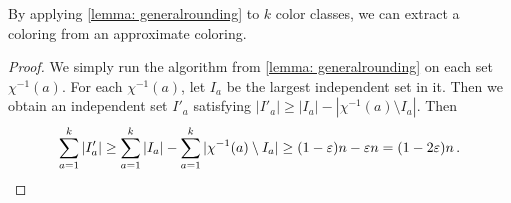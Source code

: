 By applying \cref{lemma: generalrounding} to $k$ color classes, we can extract a coloring from an approximate coloring.


\begin{proof}
    We simply run the algorithm from \cref{lemma: generalrounding} on each set $\chi^{-1}(a)$.
    For each $\chi^{-1}(a)$, let $I_a$ be the largest independent set in it.
    Then we obtain an independent set $I'_a$ satisfying $|I'_a| \geq |I_a| - |\chi^{-1}(a) \setminus I_a|$.
    Then 
    \[\sum_{a=1}^k |I'_a| \geq \sum_{a=1}^k |I_a| - \sum_{a=1}^k |\chi^{-1}(a) \setminus I_a| \geq (1 - \varepsilon)n - \varepsilon n = (1-2\varepsilon)n\,.\]
\end{proof}
